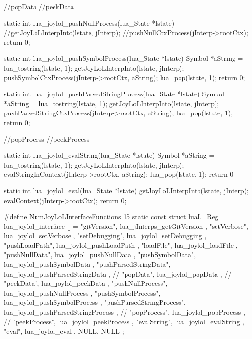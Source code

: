 //popData
//peekData

static int lua_joylol_pushNullProcess(lua_State *lstate) {
  //getJoyLoLInterpInto(lstate, jInterp);
  //pushNullCtxProcess(jInterp->rootCtx);
  return 0;
}

static int lua_joylol_pushSymbolProcess(lua_State *lstate) {
  Symbol *aString = lua_tostring(lstate, 1);
  getJoyLoLInterpInto(lstate, jInterp);
  pushSymbolCtxProcess(jInterp->rootCtx, aString);
  lua_pop(lstate, 1);
  return 0;
}


static int lua_joylol_pushParsedStringProcess(lua_State *lstate) {
  Symbol *aString = lua_tostring(lstate, 1);
  getJoyLoLInterpInto(lstate, jInterp);
  pushParsedStringCtxProcess(jInterp->rootCtx, aString);
  lua_pop(lstate, 1);
  return 0;
}

//popProcess
//peekProcess

static int lua_joylol_evalString(lua_State *lstate) {
  Symbol *aString = lua_tostring(lstate, 1);
  getJoyLoLInterpInto(lstate, jInterp);
  evalStringInContext(jInterp->rootCtx, aString);
  lua_pop(lstate, 1);
  return 0;
}

static int lua_joylol_eval(lua_State *lstate) {
  getJoyLoLInterpInto(lstate, jInterp);
  evalContext(jInterp->rootCtx);
  return 0;
}

#define NumJoyLoLInterfaceFunctions 15
static const struct luaL_Reg lua_joylol_interface [] = {
  { "gitVersion",              lua_jInterps_getGitVersion         },
  { "setVerbose",              lua_joylol_setVerbose              },
  { "setDebugging",            lua_joylol_setDebugging            },
  { "pushLoadPath",            lua_joylol_pushLoadPath            },
  { "loadFile",                lua_joylol_loadFile                },
  { "pushNullData",            lua_joylol_pushNullData            },
  { "pushSymbolData",          lua_joylol_pushSymbolData          },
  { "pushParsedStringData",    lua_joylol_pushParsedStringData    },
//  { "popData",                 lua_joylol_popData                 },
//  { "peekData",                lua_joylol_peekData                },
  { "pushNullProcess",         lua_joylol_pushNullProcess         },
  { "pushSymbolProcess",       lua_joylol_pushSymbolProcess       },
  { "pushParsedStringProcess", lua_joylol_pushParsedStringProcess },
//  { "popProcess",              lua_joylol_popProcess              },
//  { "peekProcess",             lua_joylol_peekProcess             },
  { "evalString",              lua_joylol_evalString              },
  { "eval",                    lua_joylol_eval                    },
  {NULL, NULL}
};
\stopCCode
